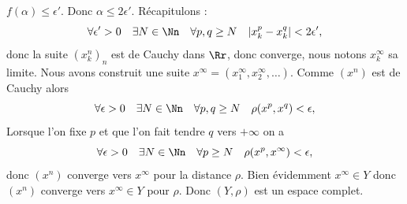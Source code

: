{\begin{enumerate}
{$f(\alpha) \le \epsilon'$. Donc $\alpha \le 2\epsilon'$.
Récapitulons :
$$\forall \epsilon' >0 \quad \exists N \in \Nn \quad \forall p,q \ge N \quad
|x^p_k-x^q_k| < 2\epsilon',$$
donc la suite $(x^n_k)_n$ est de Cauchy dans $\Rr$, donc converge, nous notons $x^\infty_k$ sa limite.
Nous avons construit une suite $x^\infty=(x^\infty_1,x^\infty_2,\ldots)$. Comme $(x^n)$ est de Cauchy alors
$$\forall \epsilon >0 \quad \exists N \in \Nn \quad \forall p,q \ge N \quad
\rho(x^p,x^q) < \epsilon,$$
Lorsque l'on fixe $p$ et que l'on fait tendre $q$ vers $+\infty$ on a
$$\forall \epsilon >0 \quad \exists N \in \Nn \quad \forall p \ge N \quad
\rho(x^p,x^\infty) < \epsilon,$$
donc $(x^n)$ converge vers $x^\infty$ pour la distance $\rho$.
Bien évidemment $x^\infty \in Y$ donc
$(x^n)$ converge vers $x^\infty \in Y$ pour $\rho$. Donc
$(Y,\rho)$ est un espace complet.
}
\end{enumerate}
}
